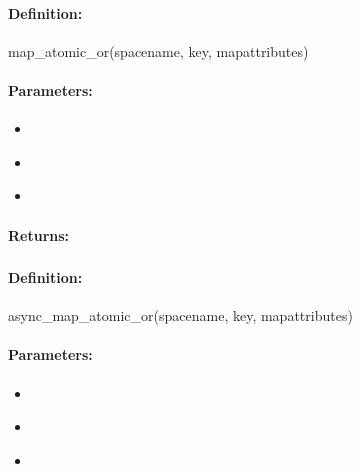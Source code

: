 \paragraph{Definition:}
\begin{rubycode}
map_atomic_or(spacename, key, mapattributes)
\end{rubycode}

\paragraph{Parameters:}
\begin{itemize}[noitemsep]
\item {}\\

\item {}\\

\item {}\\

\end{itemize}

\paragraph{Returns:}


\pagebreak
\subsubsection{}
\label{api:ruby:async_map_atomic_or}


\paragraph{Definition:}
\begin{rubycode}
async_map_atomic_or(spacename, key, mapattributes)
\end{rubycode}

\paragraph{Parameters:}
\begin{itemize}[noitemsep]
\item {}\\

\item {}\\

\item {}\\

\end{itemize}

